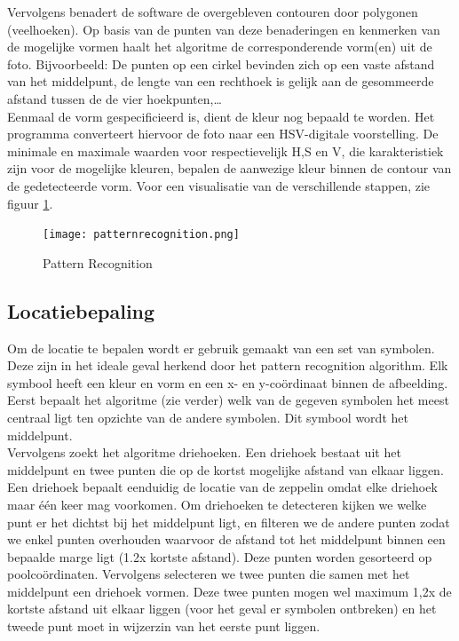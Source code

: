 \documentclass[eind]{penoverslag}
\begin{document}
Vervolgens benadert de software de overgebleven contouren door polygonen (veelhoeken). Op basis van de punten van deze benaderingen en kenmerken van de mogelijke vormen haalt het algoritme de corresponderende vorm(en) uit de foto. Bijvoorbeeld: De punten op een cirkel bevinden zich op een vaste afstand van het middelpunt, de lengte van een rechthoek is gelijk aan de gesommeerde afstand tussen de de vier hoekpunten,\ldots \\

Eenmaal de vorm gespecificieerd is, dient de kleur nog bepaald te worden.  Het programma converteert hiervoor de foto naar een HSV-digitale voorstelling. De minimale en maximale waarden voor respectievelijk H,S en V, die karakteristiek zijn voor de mogelijke kleuren, bepalen de aanwezige kleur binnen de contour van de gedetecteerde vorm. Voor een visualisatie van de verschillende stappen, zie figuur \ref{Patterns}. \\

\begin{figure}[H]
\begin{center}
\texttt{[image: patternrecognition.png]}
\end{center}
\caption{Pattern Recognition}
\label{Patterns}
\end{figure}

\subsection{Locatiebepaling}
Om de locatie te bepalen wordt er gebruik gemaakt van een set van symbolen. Deze zijn in het ideale geval herkend door het pattern recognition algorithm. Elk symbool heeft een kleur en vorm en een x- en y-coördinaat binnen de afbeelding. Eerst bepaalt het algoritme (zie verder) welk van de gegeven symbolen het meest centraal ligt ten opzichte van de andere symbolen. Dit symbool wordt het middelpunt.\\

Vervolgens zoekt het algoritme driehoeken. Een driehoek bestaat uit het middelpunt en twee punten die op de kortst mogelijke afstand van elkaar liggen. Een driehoek bepaalt eenduidig de locatie van de zeppelin omdat elke driehoek maar \'e\'en keer mag voorkomen. Om driehoeken te detecteren kijken we welke punt er het dichtst bij het middelpunt ligt, en filteren we de andere punten zodat we enkel punten overhouden waarvoor de afstand tot het middelpunt binnen een bepaalde marge ligt (1.2x kortste afstand). Deze punten worden gesorteerd op poolcoördinaten. Vervolgens selecteren we twee punten die samen met het middelpunt een driehoek vormen. Deze twee punten mogen wel maximum 1,2x de kortste afstand uit elkaar liggen (voor het geval er symbolen ontbreken) en het tweede punt moet in wijzerzin van het eerste punt liggen.\\
\end{document}
